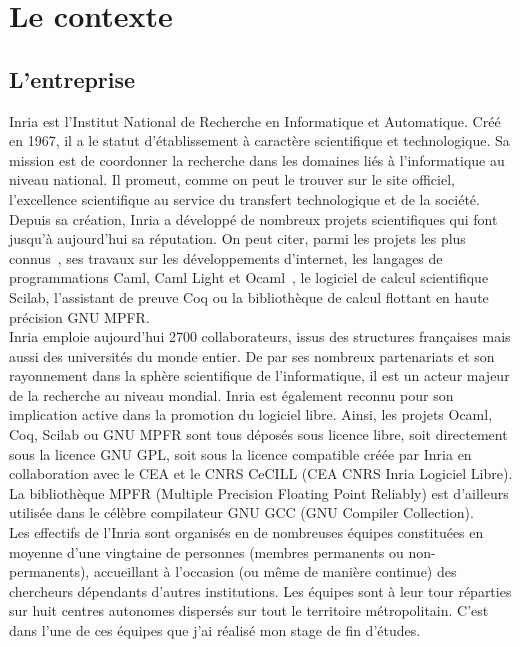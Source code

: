 \documentclass{report}
\begin{document}
\chapter{Le contexte}
\section{L'entreprise}

Inria est l'Institut National de Recherche en Informatique et Automatique. Créé en 1967, il a le statut
d'établissement à caractère scientifique et technologique. Sa mission est de coordonner la recherche dans 
les domaines liés à l'informatique au niveau national. Il promeut, comme on peut le trouver sur le site officiel,
l'excellence scientifique au service du transfert technologique et de la société.
\\ Depuis sa création, Inria a développé de nombreux projets scientifiques qui font jusqu'à aujourd'hui 
sa réputation.  On peut citer, parmi les projets les plus connus , ses travaux sur les développements 
d'internet, les langages de programmations Caml, Caml Light et Ocaml , le logiciel de calcul scientifique 
Scilab, l'assistant de preuve Coq ou la bibliothèque de calcul flottant en haute précision GNU MPFR.
\\ Inria emploie aujourd'hui 2700 collaborateurs, issus des structures françaises mais aussi des universités
du monde entier. De par ses nombreux partenariats et son rayonnement dans la sphère scientifique de 
l'informatique, il est un acteur majeur de la recherche au niveau mondial.
Inria est également reconnu pour son implication active dans la promotion du logiciel libre. Ainsi, les
projets Ocaml, Coq, Scilab ou GNU MPFR sont tous déposés sous licence libre, soit directement sous la 
licence GNU GPL, soit sous la licence compatible créée par Inria en collaboration avec le CEA et le CNRS
 CeCILL (CEA CNRS Inria Logiciel Libre). La bibliothèque MPFR (Multiple Precision Floating Point Reliably)
 est d'ailleurs utilisée dans le célèbre compilateur GNU GCC (GNU Compiler Collection).
\\ Les effectifs de l'Inria sont organisés en de nombreuses équipes constituées en moyenne d'une vingtaine
 de personnes (membres permanents ou non-permanents), accueillant à l'occasion (ou même de manière continue)
des chercheurs dépendants d'autres institutions. Les équipes sont à leur tour réparties sur huit centres 
autonomes dispersés sur tout le territoire métropolitain. C'est dans l'une de ces équipes que j'ai réalisé
mon stage de fin d'études.
\end{document}
